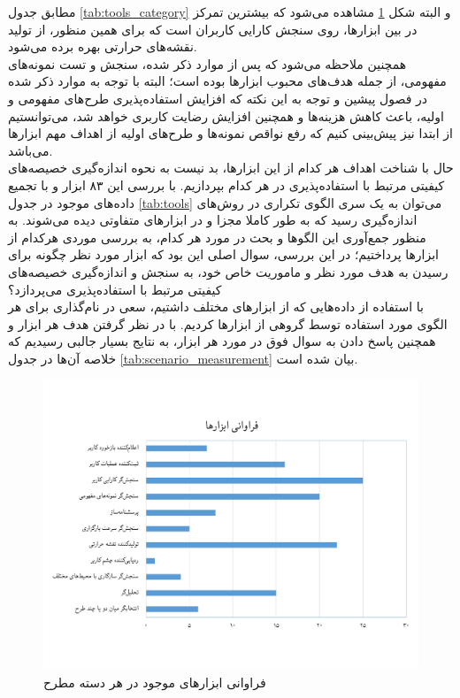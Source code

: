 مطابق جدول
\ref{tab:tools_category}
و البته شکل
\ref{fig:category_tools}
مشاهده می‌شود که بیشترین تمرکز در بین ابزارها، روی سنجش کارایی کاربران است که برای همین منظور، از تولید نقشه‌های حرارتی بهره برده می‌شود.\\
همچنین ملاحظه می‌شود که پس از موارد ذکر شده، سنجش و تست نمونه‌های مفهومی، از جمله هدف‌های محبوب ابزارها بوده است؛ البته با توجه به موارد ذکر شده در فصول پیشین و توجه به این نکته که افزایش استفاده‌پذیری طرح‌های مفهومی و اولیه، باعث کاهش هزینه‌ها و همچنین افزایش رضایت کاربری خواهد شد، می‌توانستیم از ابتدا نیز پیش‌بینی کنیم که رفع نواقص نمونه‌ها و طرح‌های اولیه از اهداف مهم ابزارها می‌باشد.\\

حال با شناخت اهداف هر کدام از این ابزارها، بد نیست به نحوه اندازه‌گیری خصیصه‌های کیفیتی مرتبط با استفاده‌پذیری در هر کدام بپردازیم. با بررسی این ۸۳ ابزار و با تجمیع داده‌های موجود در جدول
\ref{tab:tools}
می‌توان به یک سری الگوی تکراری در روش‌های اندازه‌گیری رسید که به طور کاملا مجزا و در ابزارهای متفاوتی دیده‌ می‌شوند. به منظور جمع‌آوری این الگو‌ها و بحث در مورد هر کدام، به بررسی موردی هرکدام از ابزارها پرداختیم؛ در این بررسی، سوال اصلی این بود که ابزار مورد نظر چگونه برای رسیدن به هدف مورد نظر و ماموریت خاص خود، به سنجش و اندازه‌گیری خصیصه‌های کیفیتی مرتبط با استفاده‌پذیری می‌پردازد؟\\
با استفاده از داده‌هایی که از ابزارهای مختلف داشتیم، سعی در نام‌گذاری برای هر الگوی مورد استفاده توسط گروهی از ابزارها کردیم. با در نظر گرفتن هدف هر ابزار و همچنین پاسخ دادن به سوال فوق در مورد هر ابزار، به نتایج بسیار جالبی رسیدیم که خلاصه آن‌ها در جدول
\ref{tab:scenario_measurement}
بیان شده است.
\begin{figure}[H]
	\centering\includegraphics[width=0.8\linewidth]{Resources/tools_category.pdf}
	\caption[فراوانی ابزارهای موجود در هر دسته مطرح]
	{فراوانی ابزارهای موجود در هر دسته مطرح
	}
	\label{fig:category_tools}
\end{figure}
